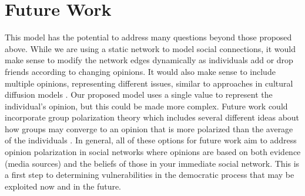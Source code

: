 \documentclass{article}
\begin{document}
\section{Future Work}
This model has the potential to address many questions beyond those proposed above. While we are using a static network to model social connections, it would make sense to modify the network edges dynamically as individuals add or drop friends according to changing opinions.  It would also make sense to include multiple opinions, representing different issues, similar to approaches in cultural diffusion models \citep{bramson2017}. Our proposed model uses a single value to represent the individual's opinion, but this could be made more complex. Future work could incorporate group polarization theory which includes several different ideas about how groups may converge to an opinion that is more polarized than the average of the individuals \citep{yardi_twitter}. In general, all of these options for future work aim to address opinion polarization in social networks where opinions are based on both evidence (media sources) and the beliefs of those in your immediate social network. This is a first step to determining vulnerabilities in the democratic process that may be exploited now and in the future.




\end{document}

